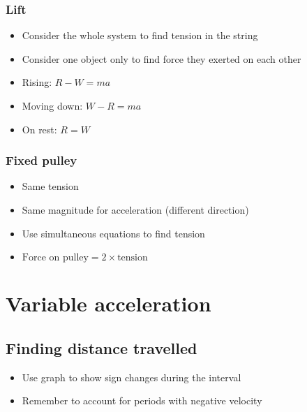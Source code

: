 \subsection{Lift}
\begin{itemize}
	\item Consider the whole system to find tension in the string
	\item Consider one object only to find force they exerted on each other
	\item Rising: $R-W=ma$
	\item Moving down: $W-R=ma$
	\item On rest: $R=W$
\end{itemize}

\subsection{Fixed pulley}
\begin{itemize}
	\item Same tension
	\item Same magnitude for acceleration (different direction)
	\item Use simultaneous equations to find tension
	\item $\text{Force on pulley} = 2 \times \text{tension}$
\end{itemize}


\chapter{Variable acceleration}
\section{Finding distance travelled}
\begin{itemize}
	\item Use graph to show sign changes during the interval
	\item Remember to account for periods with negative velocity
\end{itemize}